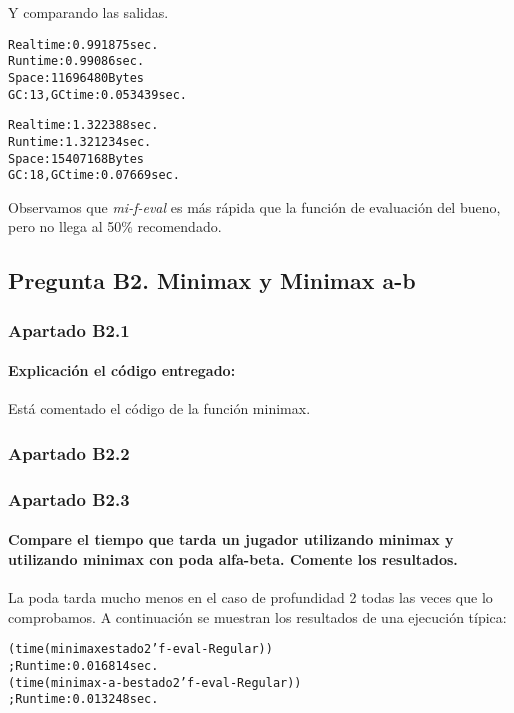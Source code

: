 \documentclass[nochap]{apuntes}
\begin{document}
Y comparando las salidas.

\begin{alltt}
Real time: 0.991875 sec.
Run time: 0.99086 sec.
Space: 11696480 Bytes
GC: 13, GC time: 0.053439 sec.

Real time: 1.322388 sec.
Run time: 1.321234 sec.
Space: 15407168 Bytes
GC: 18, GC time: 0.07669 sec.
\end{alltt}

Observamos que \textit{mi-f-eval} es más rápida que la función de evaluación del bueno, pero no llega al 50\% recomendado.

\subsection*{Pregunta B2. Minimax y Minimax a-b}
\subsubsection*{Apartado B2.1}

\paragraph{Explicación el código entregado:}

Está comentado el código de la función minimax.

\subsubsection*{Apartado B2.2}

\subsubsection*{Apartado B2.3}

\paragraph{Compare el tiempo que tarda un jugador utilizando minimax y utilizando minimax con poda alfa-beta. Comente los resultados.}

La poda tarda mucho menos en el caso de profundidad 2 todas las veces que lo comprobamos. A continuación se muestran los resultados de una ejecución típica:
\begin{alltt}
(time (minimax estado 2 'f-eval-Regular)) 
  ; Run time: 0.016814 sec.
(time (minimax-a-b estado 2 'f-eval-Regular)) 
  ; Run time: 0.013248 sec.
\end{alltt}
\end{document}

